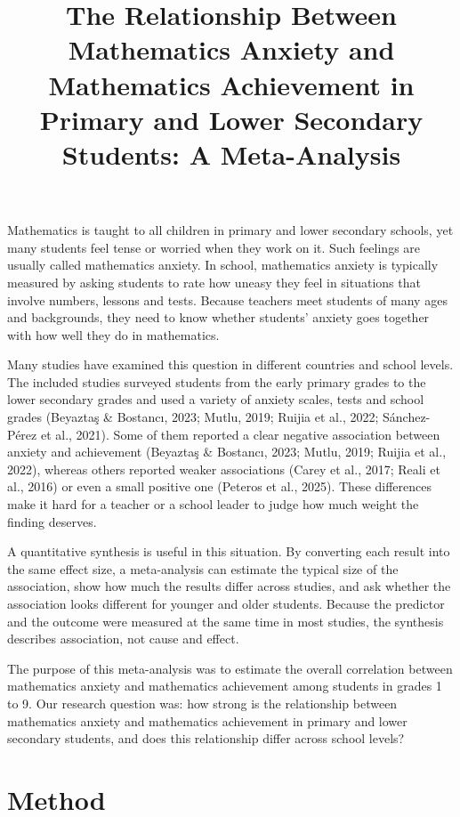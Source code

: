 \documentclass[man,a4paper,12pt,floatsintext,nolmodern,notab]{apa7}
\title{The Relationship Between Mathematics Anxiety and Mathematics Achievement in Primary and Lower Secondary Students: A Meta-Analysis}
\begin{document}
\maketitle
Mathematics is taught to all children in primary and lower secondary schools, yet many students feel tense or worried when they work on it. Such feelings are usually called mathematics anxiety. In school, mathematics anxiety is typically measured by asking students to rate how uneasy they feel in situations that involve numbers, lessons and tests. Because teachers meet students of many ages and backgrounds, they need to know whether students' anxiety goes together with how well they do in mathematics.

Many studies have examined this question in different countries and school levels. The included studies surveyed students from the early primary grades to the lower secondary grades and used a variety of anxiety scales, tests and school grades (Beyaztaş \& Bostancı, 2023; Mutlu, 2019; Ruijia et al., 2022; Sánchez-Pérez et al., 2021). Some of them reported a clear negative association between anxiety and achievement (Beyaztaş \& Bostancı, 2023; Mutlu, 2019; Ruijia et al., 2022), whereas others reported weaker associations (Carey et al., 2017; Reali et al., 2016) or even a small positive one (Peteros et al., 2025). These differences make it hard for a teacher or a school leader to judge how much weight the finding deserves.

A quantitative synthesis is useful in this situation. By converting each result into the same effect size, a meta-analysis can estimate the typical size of the association, show how much the results differ across studies, and ask whether the association looks different for younger and older students. Because the predictor and the outcome were measured at the same time in most studies, the synthesis describes association, not cause and effect.

The purpose of this meta-analysis was to estimate the overall correlation between mathematics anxiety and mathematics achievement among students in grades 1 to 9. Our research question was: how strong is the relationship between mathematics anxiety and mathematics achievement in primary and lower secondary students, and does this relationship differ across school levels?

\section{Method}
\end{document}

